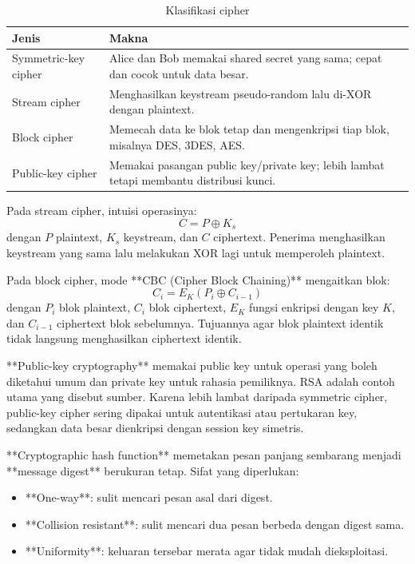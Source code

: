 \begin{table}[H]
\centering
\begin{tabularx}{\textwidth}{|L{0.26\textwidth}|X|}
\hline
\textbf{Jenis} & \textbf{Makna} \\
\hline
Symmetric-key cipher & Alice dan Bob memakai shared secret yang sama; cepat dan cocok untuk data besar. \\
\hline
Stream cipher & Menghasilkan keystream pseudo-random lalu di-XOR dengan plaintext. \\
\hline
Block cipher & Memecah data ke blok tetap dan mengenkripsi tiap blok, misalnya DES, 3DES, AES. \\
\hline
Public-key cipher & Memakai pasangan public key/private key; lebih lambat tetapi membantu distribusi kunci. \\
\hline
\end{tabularx}
\caption{Klasifikasi cipher}
\label{tab:cipher-types}
\end{table}

Pada stream cipher, intuisi operasinya:
\[
    C = P \oplus K_s
\]
dengan $P$ plaintext, $K_s$ keystream, dan $C$ ciphertext. Penerima menghasilkan keystream yang sama lalu melakukan XOR lagi untuk memperoleh plaintext.

Pada block cipher, mode **CBC (Cipher Block Chaining)** mengaitkan blok:
\[
    C_i = E_K(P_i \oplus C_{i-1})
\]
dengan $P_i$ blok plaintext, $C_i$ blok ciphertext, $E_K$ fungsi enkripsi dengan key $K$, dan $C_{i-1}$ ciphertext blok sebelumnya. Tujuannya agar blok plaintext identik tidak langsung menghasilkan ciphertext identik.

**Public-key cryptography** memakai public key untuk operasi yang boleh diketahui umum dan private key untuk rahasia pemiliknya. RSA adalah contoh utama yang disebut sumber. Karena lebih lambat daripada symmetric cipher, public-key cipher sering dipakai untuk autentikasi atau pertukaran key, sedangkan data besar dienkripsi dengan session key simetris.

**Cryptographic hash function** memetakan pesan panjang sembarang menjadi **message digest** berukuran tetap. Sifat yang diperlukan:
\begin{itemize}
    \item **One-way**: sulit mencari pesan asal dari digest.
    \item **Collision resistant**: sulit mencari dua pesan berbeda dengan digest sama.
    \item **Uniformity**: keluaran tersebar merata agar tidak mudah dieksploitasi.
\end{itemize}

